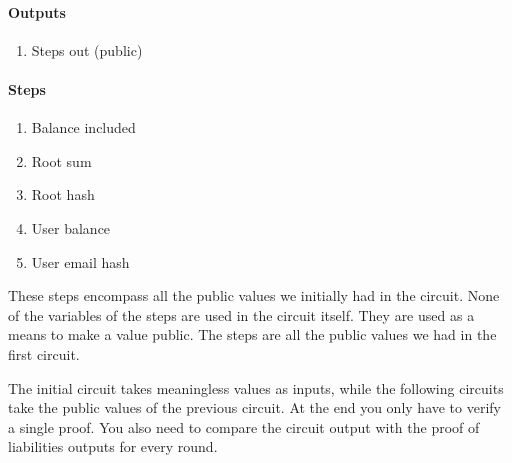 \paragraph{Outputs}
\begin{enumerate}
   \item Steps out (public)
   \end{enumerate}


\paragraph{Steps}
\begin{enumerate}
   \item Balance included
   \item Root sum
   \item Root hash
   \item User balance
   \item User email hash
   \end{enumerate}
These steps encompass all the public values we initially had in the circuit.
None of the variables of the steps are used in the circuit itself. They are used as a means to make a value public.
The steps are all the public values we had in the first circuit.


The initial circuit takes meaningless values as inputs, while the following circuits take the public values of the previous circuit.
At the end you only have to verify a single proof. You also need to compare the circuit output with the proof of liabilities outputs for every round.



